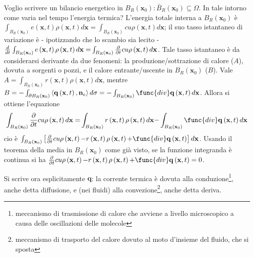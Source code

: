 \documentclass{article}
\begin{document}
Voglio scrivere un bilancio energetico in $B_{R}\left( \mathbf{x}_{0}\right)
:\bar{B}_{R}\left( \mathbf{x}_{0}\right) \subseteq \Omega $. In tale intorno
come varia nel tempo l'energia termica? L'energia totale interna a $%
B_{R}\left( \mathbf{x}_{0}\right) $ \`{e} $\int_{B_{R}\left( \mathbf{x}%
_{0}\right) }e\left( \mathbf{x},t\right) \rho \left( \mathbf{x},t\right) d%
\mathbf{x}=\int_{B_{R}\left( \mathbf{x}_{0}\right) }cu\rho \left( \mathbf{x}%
,t\right) d\mathbf{x}$; il suo tasso istantaneo di variazione \`{e} -
ipotizzando che lo scambio sia lecito - $\frac{d}{dt}\int_{B_{R}\left( 
\mathbf{x}_{0}\right) }e\left( \mathbf{x},t\right) \rho \left( \mathbf{x}%
,t\right) d\mathbf{x=}\int_{B_{R}\left( \mathbf{x}_{0}\right) }\frac{%
\partial }{\partial t}cu\rho \left( \mathbf{x},t\right) d\mathbf{x}$. Tale
tasso istantaneo \`{e} da considerarsi derivante da due fenomeni: la
produzione/sottrazione di calore ($A$), dovuta a sorgenti o pozzi, e il
calore entrante/uscente in $B_{R}\left( \mathbf{x}_{0}\right) $ ($B$). Vale $%
A=\int_{B_{R}\left( \mathbf{x}_{0}\right) }r\left( \mathbf{x},t\right) \rho
\left( \mathbf{x},t\right) d\mathbf{x}$, mentre $B=-\int_{\partial
B_{R}\left( \mathbf{x}_{0}\right) }\left\langle \mathbf{q}\left( \mathbf{x}%
,t\right) ,\mathbf{n}_{e}\right\rangle d\sigma =-\int_{B_{R}\left( \mathbf{x}%
_{0}\right) }\func{div}\mathbf{q}\left( \mathbf{x},t\right) d\mathbf{x}$.
Allora si ottiene l'equazione 
\begin{equation*}
\int_{B_{R}\left( \mathbf{x}_{0}\right) }%
\frac{\partial }{\partial t}cu\rho \left( \mathbf{x},t\right) d\mathbf{x=}%
\int_{B_{R}\left( \mathbf{x}_{0}\right) }r\left( \mathbf{x},t\right) \rho
\left( \mathbf{x},t\right) d\mathbf{x-}\int_{B_{R}\left( \mathbf{x}%
_{0}\right) }\func{div}\mathbf{q}\left( \mathbf{x},t\right) d\mathbf{x}
\end{equation*}
cio%
\`{e} $\int_{B_{R}\left( \mathbf{x}_{0}\right) }\left[ \frac{\partial }{%
\partial t}cu\rho \left( \mathbf{x},t\right) \mathbf{-}r\left( \mathbf{x}%
,t\right) \rho \left( \mathbf{x},t\right) \mathbf{+}\func{div}\mathbf{q}%
\left( \mathbf{x},t\right) \right] d\mathbf{x}$. Usando il teorema della
media in $B_{R}\left( \mathbf{x}_{0}\right) $ come gi\`{a} visto, se la
funzione integranda \`{e} continua si ha $\frac{\partial }{\partial t}cu\rho
\left( \mathbf{x},t\right) \mathbf{-}r\left( \mathbf{x},t\right) \rho \left( 
\mathbf{x},t\right) \mathbf{+}\func{div}\mathbf{q}\left( \mathbf{x},t\right)
=0$.

Si scrive ora esplicitamente $\mathbf{q}$: la corrente termica \`{e} dovuta
alla conduzione\footnote{%
meccanismo di trasmissione di calore che avviene a livello microscopico a
causa delle oscillazioni delle molecole}, anche detta diffusione, e (nei
fluidi) alla convezione\footnote{%
meccanismo di trasporto del calore dovuto al moto d'insieme del fluido, che
si sposta}, anche detta deriva.
\end{document}
